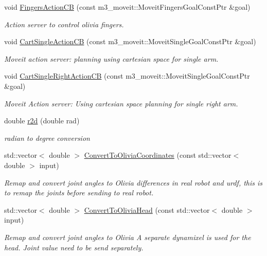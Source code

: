 \begin{DoxyCompactItemize}
void \hyperlink{classM3MoveGroup_a50f3c0ec424696c8d613cbfb18829384}{Fingers\+Action\+CB} (const m3\+\_\+moveit\+::\+Moveit\+Fingers\+Goal\+Const\+Ptr \&goal)
\begin{DoxyCompactList}\small\item\em Action server to control olivia fingers. \end{DoxyCompactList}\item 
void \hyperlink{classM3MoveGroup_a71fc79c75e8e96881d0cfa6629f5e11d}{Cart\+Single\+Action\+CB} (const m3\+\_\+moveit\+::\+Moveit\+Single\+Goal\+Const\+Ptr \&goal)
\begin{DoxyCompactList}\small\item\em Moveit action server\+: planning using cartesian space for single arm. \end{DoxyCompactList}\item 
void \hyperlink{classM3MoveGroup_a6ce4ef5d30fc1e93826f4f8104f8db04}{Cart\+Single\+Right\+Action\+CB} (const m3\+\_\+moveit\+::\+Moveit\+Single\+Goal\+Const\+Ptr \&goal)
\begin{DoxyCompactList}\small\item\em Moveit Action server\+: Using cartesian space planning for single right arm. \end{DoxyCompactList}\item 
double \hyperlink{classM3MoveGroup_a08ae3af12542a9dd44d5f823c8b3bb46}{r2d} (double rad)
\begin{DoxyCompactList}\small\item\em radian to degree conversion \end{DoxyCompactList}\item 
std\+::vector$<$ double $>$ \hyperlink{classM3MoveGroup_a76eed72085b10fa6fea6f9cc773a7901}{Convert\+To\+Olivia\+Coordinates} (const std\+::vector$<$ double $>$ input)
\begin{DoxyCompactList}\small\item\em Remap and convert joint angles to Olivia differences in real robot and urdf, this is to remap the joints before sending to real robot. \end{DoxyCompactList}\item 
std\+::vector$<$ double $>$ \hyperlink{classM3MoveGroup_a59d8555d6560673417be20d6bf5d6aae}{Convert\+To\+Olivia\+Head} (const std\+::vector$<$ double $>$ input)
\begin{DoxyCompactList}\small\item\em Remap and convert joint angles to Olivia A separate dynamixel is used for the head. Joint value need to be send separately. \end{DoxyCompactList}\item 

\end{DoxyCompactItemize}
